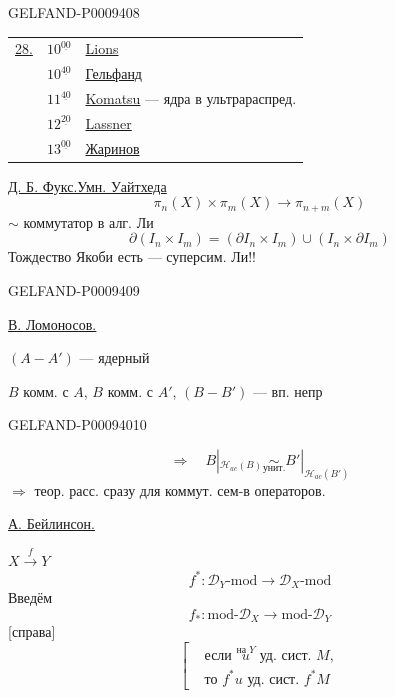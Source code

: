 \begin{GelfandAdjacentEvidence}{GELFAND-P000940}{8}


\begin{tabular}{@{}lll@{}}
\underline{28.} & $10^{\underline{00}}$ & \underline{Lions}\\
 & $10^{\underline{40}}$ & \underline{Гельфанд}\\
 & $11^{\underline{40}}$ & \underline{Komatsu} --- ядра в ультрараспред.\\
 & $12^{\underline{20}}$ & \underline{Lassner}\\
 & $13^{\underline{00}}$ & \underline{Жаринов}
\end{tabular}

\underline{Д. Б. Фукс.}\qquad\underline{Умн. Уайтхеда}
\[
 \pi_n(X)\times\pi_m(X)\longrightarrow\pi_{n+m}(X)
\]
$\sim$ коммутатор в алг. Ли
\[
 \partial(I_n\times I_m)=(\partial I_n\times I_m)\cup(I_n\times\partial I_m)
\]
Тождество Якоби есть --- суперсим. Ли!!
\end{GelfandAdjacentEvidence}
\begin{GelfandAdjacentEvidence}{GELFAND-P000940}{9}


\underline{\underline{В. Ломоносов.}}

$(A-A')$ --- ядерный

$B$ комм. с $A$, $B$ комм. с $A'$, $(B-B')$ --- вп. непр
\end{GelfandAdjacentEvidence}
\begin{GelfandAdjacentEvidence}{GELFAND-P000940}{10}

\[
 \Rightarrow\quad B|_{\mathcal H_{ac}(B)}\underset{\text{унит.}}{\sim}
 B'|_{\mathcal H_{ac}(B')}
\]
$\Rightarrow$ теор. расс. сразу для коммут. сем-в операторов.

\underline{\underline{А. Бейлинсон.}}

\(X\overset f\longrightarrow Y\)
\begin{equation*}
 f^*:\mathcal D_Y\text{-mod}\longrightarrow\mathcal D_X\text{-mod}
 \tag{1}
\end{equation*}
Введём
\[
 f_*:\text{mod-}\mathcal D_X\longrightarrow\text{mod-}\mathcal D_Y
\]
[справа]
\[
 \left[\begin{aligned}
 &\text{если }\overset{\text{на $Y$}}{u}\text{ уд. сист. }M,\\
 &\text{то }f^*u\text{ уд. сист. }f^*M
 \end{aligned}\right.
\]
\end{GelfandAdjacentEvidence}
